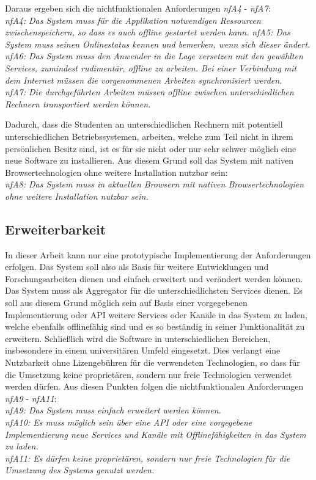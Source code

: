Daraus ergeben sich die nichtfunktionalen Anforderungen \emph{nfA4} - \emph{nfA7}:\\
\emph{nfA4: Das System muss für die Applikation notwendigen Ressourcen zwischenspeichern, so dass es auch offline gestartet werden kann.}
\emph{nfA5: Das System muss seinen Onlinestatus kennen und bemerken, wenn sich dieser ändert.}
\emph{nfA6: Das System muss den Anwender in die Lage versetzen mit den gewählten Services, zumindest rudimentär, offline zu arbeiten. Bei einer Verbindung mit dem Internet müssen die vorgenommenen Arbeiten synchronisiert werden.}\\
\emph{nfA7: Die durchgeführten Arbeiten müssen offline zwischen unterschiedlichen Rechnern transportiert werden können.}

Dadurch, dass die Studenten an unterschiedlichen Rechnern mit potentiell unterschiedlichen Betriebssystemen, arbeiten, welche zum Teil nicht in ihrem persönlichen Besitz sind, ist es für sie nicht oder nur sehr schwer möglich eine neue Software zu installieren. Aus diesem Grund soll das System mit nativen Browsertechnologien ohne weitere Installation nutzbar sein:\\
\emph{nfA8: Das System muss in aktuellen Browsern mit nativen Browsertechnologien ohne weitere Installation nutzbar sein.}

\subsection{Erweiterbarkeit}
In dieser Arbeit kann nur eine prototypische Implementierung der Anforderungen erfolgen. Das System soll also als Basis für weitere Entwicklungen und Forschungsarbeiten dienen und einfach erweitert und verändert werden können. Das System muss als Aggregator für die unterschiedlichsten Services dienen. Es soll aus diesem Grund möglich sein auf Basis einer vorgegebenen Implementierung oder API weitere Services oder Kanäle in das System zu laden, welche ebenfalls offlinefähig sind und es so beständig in seiner Funktionalität zu erweitern. Schließlich wird die Software in unterschiedlichen Bereichen, insbesondere in einem universitären Umfeld eingesetzt. Dies verlangt eine Nutzbarkeit ohne Lizengebühren für die verwendeten Technologien, so dass für die Umsetzung keine proprietären, sondern nur freie Technologien verwendet werden dürfen. Aus diesen Punkten folgen die nichtfunktionalen Anforderungen \emph{nfA9} - \emph{nfA11}:\\
\emph{nfA9: Das System muss einfach erweitert werden können.}\\
\emph{nfA10: Es muss möglich sein über eine API oder eine vorgegebene Implementierung neue Services und Kanäle mit Offlinefähigkeiten in das System zu laden.}\\
\emph{nfA11: Es dürfen keine proprietären, sondern nur freie Technologien für die Umsetzung des Systems genutzt werden.}
 
